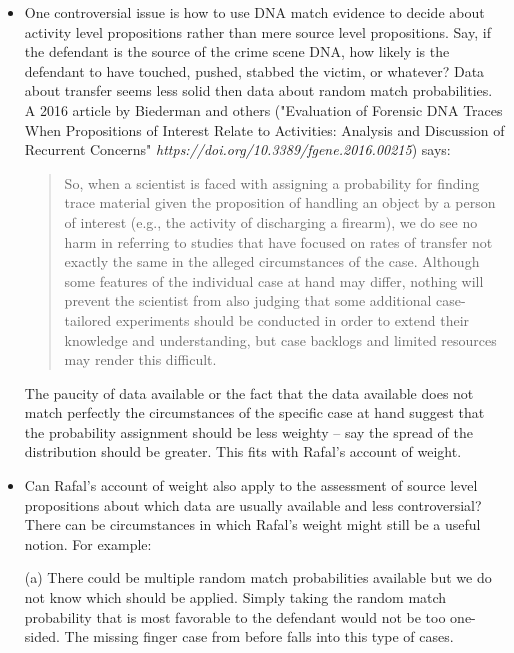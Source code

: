 \documentclass[
  10pt,
  dvipsnames,enabledeprecatedfontcommands]{scrartcl}
\begin{document}
\begin{itemize}
 
 \item One controversial issue is  how to use DNA match evidence to decide about activity level propositions rather than mere source level propositions. Say, if the defendant is the source of the crime scene DNA, how likely is the defendant to have touched, pushed, stabbed the victim, or whatever? Data about transfer seems less solid then data about random match probabilities. A 2016 article by Biederman and others ("Evaluation of Forensic DNA Traces When Propositions of Interest Relate to Activities: Analysis and Discussion of Recurrent Concerns" \textit{https://doi.org/10.3389/fgene.2016.00215}) says:
 \begin{quote}
 So, when a scientist is faced with assigning a probability for finding trace material given the proposition of handling an object by a person of interest (e.g., the activity of discharging a firearm), we do see no harm in referring to studies that have focused on rates of transfer not exactly the same in the alleged circumstances of the case. Although some features of the individual case at hand may differ, nothing will prevent the scientist from also judging that some additional case-tailored experiments should be conducted in order to extend their knowledge and understanding, but case backlogs and limited resources may render this difficult.
\end{quote} 
 The paucity of data available or the fact that the data available does not match perfectly the circumstances of the specific case at hand suggest that the probability assignment should be less weighty -- say the spread of the distribution should be greater. This fits with Rafal's account of weight.
 
 
 
 \item Can Rafal's account of weight also apply to the assessment of source level propositions about which data are usually available and less controversial? There can be circumstances in which Rafal's weight might still be a useful notion. For example:
 
 (a) There could be multiple random match probabilities available but we do not know which should be applied. Simply taking the random match probability that is most favorable to the defendant would not be too one-sided. The missing finger case from before falls into this type of cases. 
 

\end{itemize}
\end{document}
